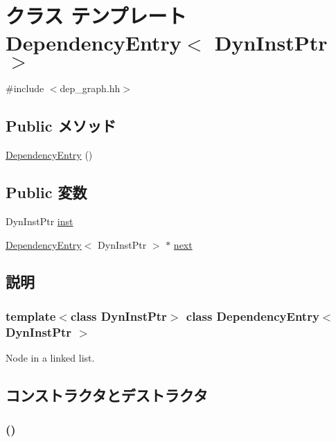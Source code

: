 \hypertarget{classDependencyEntry}{
\section{クラス テンプレート DependencyEntry$<$ DynInstPtr $>$}
\label{classDependencyEntry}
}


{\ttfamily \#include $<$dep\_\-graph.hh$>$}\subsection*{Public メソッド}
\begin{DoxyCompactItemize}
\item 
\hyperlink{classDependencyEntry_ac0d830ad4fc119538a5928b2b805898e}{DependencyEntry} ()
\end{DoxyCompactItemize}
\subsection*{Public 変数}
\begin{DoxyCompactItemize}
\item 
DynInstPtr \hyperlink{classDependencyEntry_af5d4fb974eeb4507d4c837d365d0cefc}{inst}
\item 
\hyperlink{classDependencyEntry}{DependencyEntry}$<$ DynInstPtr $>$ $\ast$ \hyperlink{classDependencyEntry_a8e52e096475018c4b11a52dc63a23a02}{next}
\end{DoxyCompactItemize}


\subsection{説明}
\subsubsection*{template$<$class DynInstPtr$>$ class DependencyEntry$<$ DynInstPtr $>$}

Node in a linked list. 

\subsection{コンストラクタとデストラクタ}
\hypertarget{classDependencyEntry_ac0d830ad4fc119538a5928b2b805898e}{
\subsubsection[{DependencyEntry}]{ ()}}
\label{classDependencyEntry_ac0d830ad4fc119538a5928b2b805898e}



